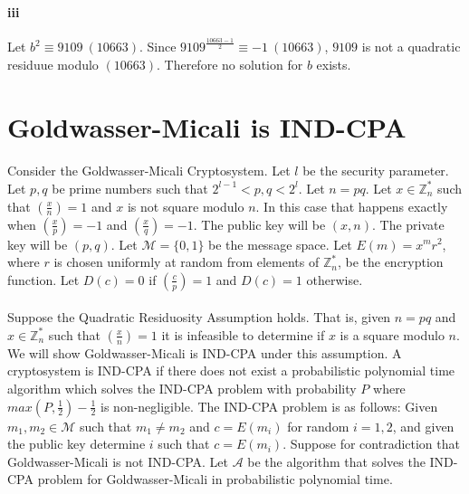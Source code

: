 \documentclass[letterpaper,12pt,oneside,onecolumn]{report}
\begin{document}
\paragraph{iii}
Let $b^2 \equiv 9109\ (10663)$. Since $9109^{\frac{10663-1}{2}} \equiv -1\ (10663)$, $9109$ is not a quadratic residuue modulo $(10663)$. Therefore no solution for $b$ exists.
\section*{Goldwasser-Micali is IND-CPA}
\paragraph{}
Consider the Goldwasser-Micali Cryptosystem. Let $l$ be the security parameter. Let $p,q$ be prime numbers such that $2^{l-1} < p,q < 2^l$. Let $n = pq$. Let $x \in \mathbb{Z}_n^*$ such that $\left(\frac{x}{n}\right) = 1$ and $x$ is not square modulo $n$. In this case that happens exactly when $\left(\frac{x}{p}\right) = -1$ and $\left(\frac{x}{q}\right) = -1$. The public key will be $(x,n)$. The private key will be $(p,q)$. Let $\mathcal{M} = \{0,1\}$ be the message space. Let $E(m) = x^mr^2$, where $r$ is chosen uniformly at random from elements of $\mathbb{Z}_n^*$, be the encryption function. Let $D(c) = 0$ if $\left(\frac{c}{p}\right) = 1$ and $D(c) = 1$ otherwise.
\paragraph{}
Suppose the Quadratic Residuosity Assumption holds. That is, given $n=pq$ and $x \in \mathbb{Z}_n^*$ such that $\left(\frac{x}{n}\right) = 1$ it is infeasible to determine if $x$ is a square modulo $n$. We will show Goldwasser-Micali is IND-CPA under this assumption. A cryptosystem is IND-CPA if there does not exist a probabilistic polynomial time algorithm which solves the IND-CPA problem with probability $P$ where $max(P,\frac{1}{2}) - \frac{1}{2}$ is non-negligible. The IND-CPA problem is as follows: Given $m_1, m_2 \in \mathcal{M}$ such that $m_1 \neq m_2$ and $c = E(m_i)$ for random $i=1,2$, and given the public key determine  $i$ such that $c=E(m_i)$. Suppose for contradiction that Goldwasser-Micali is not IND-CPA. Let $\mathcal{A}$ be the algorithm that solves the IND-CPA problem for Goldwasser-Micali in probabilistic polynomial time.
\end{document}
